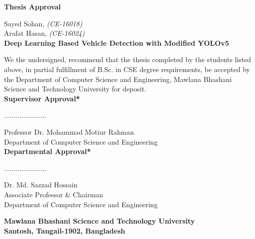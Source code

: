 \begin{titlepage}
\begin{center}
    
    
    \LARGE
    \textbf{Thesis Approval\\}
    
    \vspace{2cm}
    
    \large
   \large{Sayed Sohan, \small{\textit{(CE-16018)}}}\\
    \large{Arafat Hasan, \small{\textit{(CE-16024)}}}\\
    
    \vspace{0.5cm}
    \large
    \textbf{Deep Learning Based Vehicle Detection with Modified YOLOv5\\}

    
    \vspace{1cm}
    \normalsize
     We the undersigned, recommend that the thesis completed by the students listed above, in partial fulfillment of B.Sc. in CSE degree requirements, be accepted by the Department of Computer Science and Engineering, Mawlana Bhashani Science and Technology University for deposit.\\


     
     \vspace{1cm}
     \normalsize
     \textbf{Supervisor Approval*}
      
      \vspace{1cm}
      \normalsize
      ......................
      
      \vspace{0.2cm}
      \normalsize
      Professor Dr. Mohammad Motiur Rahman \\
      Department of Computer Science and Engineering\\
      
    \vspace{0.3cm}
    \normalsize
     \textbf{Departmental Approval*}
      
      \vspace{1cm}
      \normalsize
      ......................
      
      \vspace{0.2cm}
      \normalsize
      Dr. Md. Sazzad Hossain\\
      Associate Professor \& Chairman \\Department of Computer Science and Engineering
      
      
      \vspace{1cm}
      \normalsize
      \textbf
      {Mawlana Bhashani Science and Technology University\\
      Santosh, Tangail-1902, Bangladesh}
      
    
\end{center}
\end{titlepage}